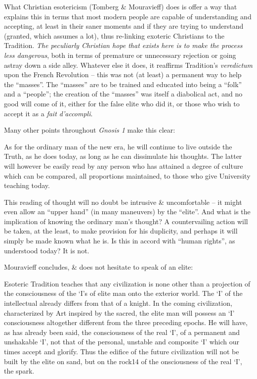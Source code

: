 What Christian esotericism (Tomberg \& Mouravieff) does is offer a way that explains this in terms that most modern people are capable of understanding and accepting, at least in their saner moments and if they are trying to understand (granted, which assumes a lot), thus re-linking exoteric Christians to the Tradition. \emph{The peculiarly Christian hope that exists here is to make the process less dangerous}, both in terms of premature or unnecessary rejection or going astray down a side alley. Whatever else it does, it reaffirms Tradition's \emph{veredictum} upon the French Revolution -- this was not (at least) a permanent way to help the ``masses''. The ``masses'' are to be trained and educated into being a ``folk'' and a ``people''; the creation of the ``masses'' was itself a diabolical act, and no good will come of it, either for the false elite who did it, or those who wish to accept it as a \emph{fait d'accompli}.

Many other points throughout \emph{Gnosis 1} make this clear:
\begin{quotex}
As for the ordinary man of the new era, he will continue to live outside the Truth, as he does today, as long as he can dissimulate his thoughts. The latter will however be easily read by any person who has attained a degree of culture which can be compared, all proportions maintained, to those who give University teaching today.
\end{quotex}


This reading of thought will no doubt be intrusive \& uncomfortable -- it might even allow an ``upper hand'' (in many maneuvers) by the ``elite''. And what is the implication of knowing the ordinary man's thought? A countervailing action will be taken, at the least, to make provision for his duplicity, and perhaps it will simply be made known what he is. Is this in accord with ``human rights'', as understood today? It is not.

Mouravieff concludes, \& does not hesitate to speak of an elite:

\begin{quotex}
Esoteric Tradition teaches that any civilization is none other than a projection of the consciousness of the `I's of elite man onto the exterior world. The `I' of the intellectual already differs from that of a knight. In the coming civilization, characterized by Art inspired by the sacred, the elite man will possess an `I' consciousness altogether different from the three preceding epochs. He will have, as has already been said, the consciousness of the real `I', of a permanent and unshakable `I', not that of the personal, unstable and composite `I' which our times accept and glorify. Thus the edifice of the future civilization will not be built by the elite on sand, but on the rock14 of the onsciousness of the real `I', the spark.
\end{quotex}


